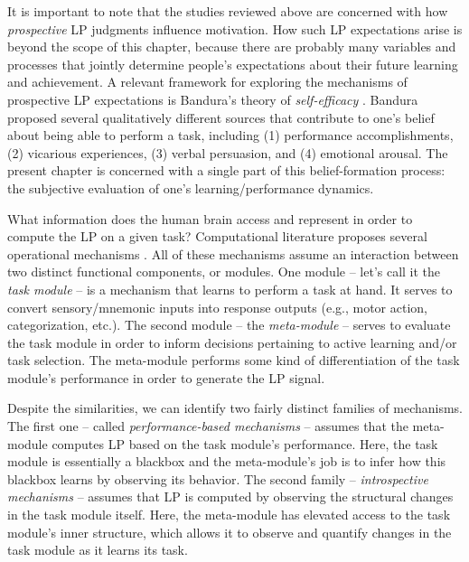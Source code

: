 It is important to note that the studies reviewed above are concerned with how \emph{prospective} \ac{LP} judgments influence motivation. How such \ac{LP} expectations arise is beyond the scope of this chapter, because there are probably many variables and processes that jointly determine people's expectations about their future learning and achievement. A relevant framework for exploring the mechanisms of prospective \ac{LP} expectations is Bandura's theory of \emph{self-efficacy} \cite{bandura_self-efficacy_1977}. Bandura proposed several qualitatively different sources that contribute to one's belief about being able to perform a task, including (1) performance accomplishments, (2) vicarious experiences, (3) verbal persuasion, and (4) emotional arousal. The present chapter is concerned with a single part of this belief-formation process: the subjective evaluation of one's learning/performance dynamics. 

What information does the human brain access and represent in order to compute the \ac{LP} on a given task? Computational literature proposes several operational mechanisms \cite{oudeyer_what_2007,graves_automated_2017,twomey_curiosity-based_2018,linke_adapting_2020}. All of these mechanisms assume an interaction between two distinct functional components, or modules. One module -- let's call it the \emph{task module} -- is a mechanism that learns to perform a task at hand. It serves to convert sensory/mnemonic inputs into response outputs (e.g., motor action, categorization, etc.). The second module -- the \emph{meta-module} -- serves to evaluate the task module in order to inform decisions pertaining to active learning and/or task selection. The meta-module performs some kind of differentiation of the task module's performance in order to generate the \ac{LP} signal.  

Despite the similarities, we can identify two fairly distinct families of mechanisms. The first one -- called \emph{performance-based mechanisms} -- assumes that the meta-module computes \ac{LP} based on the task module's performance. Here, the task module is essentially a blackbox and the meta-module's job is to infer how this blackbox learns by observing its behavior. The second family -- \emph{introspective mechanisms} -- assumes that \ac{LP} is computed by observing the structural changes in the task module itself. Here, the meta-module has elevated access to the task module's inner structure, which allows it to observe and quantify changes in the task module as it learns its task.

